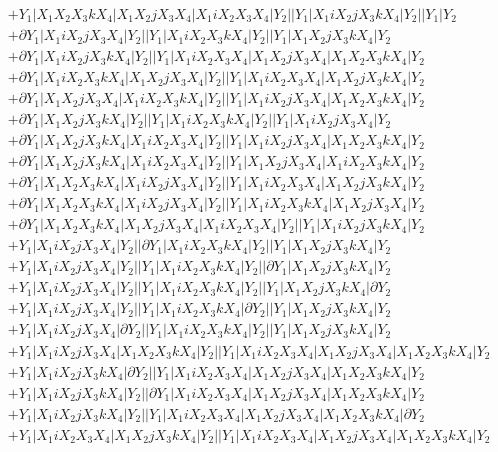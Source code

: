\documentclass{article}[12pt]
\begin{document}
\begin{align*}
 & + Y_1|X_1X_2X_3kX_4|X_1X_2jX_3X_4|X_1iX_2X_3X_4|Y_2||Y_1|X_1iX_2jX_3kX_4|Y_2||Y_1|Y_2\\ 
& +\partial Y_1|X_1iX_2jX_3X_4|Y_2||Y_1|X_1iX_2X_3kX_4|Y_2||Y_1|X_1X_2jX_3kX_4|Y_2\\ 
 & +\partial Y_1|X_1iX_2jX_3kX_4|Y_2||Y_1|X_1iX_2X_3X_4|X_1X_2jX_3X_4|X_1X_2X_3kX_4|Y_2\\ 
 & +\partial Y_1|X_1iX_2X_3kX_4|X_1X_2jX_3X_4|Y_2||Y_1|X_1iX_2X_3X_4|X_1X_2jX_3kX_4|Y_2\\ 
 & +\partial Y_1|X_1X_2jX_3X_4|X_1iX_2X_3kX_4|Y_2||Y_1|X_1iX_2jX_3X_4|X_1X_2X_3kX_4|Y_2\\ 
 & +\partial Y_1|X_1X_2jX_3kX_4|Y_2||Y_1|X_1iX_2X_3kX_4|Y_2||Y_1|X_1iX_2jX_3X_4|Y_2\\ 
 & +\partial Y_1|X_1X_2jX_3kX_4|X_1iX_2X_3X_4|Y_2||Y_1|X_1iX_2jX_3X_4|X_1X_2X_3kX_4|Y_2\\ 
 & +\partial Y_1|X_1X_2jX_3kX_4|X_1iX_2X_3X_4|Y_2||Y_1|X_1X_2jX_3X_4|X_1iX_2X_3kX_4|Y_2\\ 
 & +\partial Y_1|X_1X_2X_3kX_4|X_1iX_2jX_3X_4|Y_2||Y_1|X_1iX_2X_3X_4|X_1X_2jX_3kX_4|Y_2\\ 
 & +\partial Y_1|X_1X_2X_3kX_4|X_1iX_2jX_3X_4|Y_2||Y_1|X_1iX_2X_3kX_4|X_1X_2jX_3X_4|Y_2\\ 
 & +\partial Y_1|X_1X_2X_3kX_4|X_1X_2jX_3X_4|X_1iX_2X_3X_4|Y_2||Y_1|X_1iX_2jX_3kX_4|Y_2\\ 
 & +Y_1|X_1iX_2jX_3X_4|Y_2||\partial Y_1|X_1iX_2X_3kX_4|Y_2||Y_1|X_1X_2jX_3kX_4|Y_2\\ 
 & +Y_1|X_1iX_2jX_3X_4|Y_2||Y_1|X_1iX_2X_3kX_4|Y_2||\partial Y_1|X_1X_2jX_3kX_4|Y_2\\ 
 & +Y_1|X_1iX_2jX_3X_4|Y_2||Y_1|X_1iX_2X_3kX_4|Y_2||Y_1|X_1X_2jX_3kX_4|\partial Y_2\\ 
 & +Y_1|X_1iX_2jX_3X_4|Y_2||Y_1|X_1iX_2X_3kX_4|\partial Y_2||Y_1|X_1X_2jX_3kX_4|Y_2\\ 
 & +Y_1|X_1iX_2jX_3X_4|\partial Y_2||Y_1|X_1iX_2X_3kX_4|Y_2||Y_1|X_1X_2jX_3kX_4|Y_2\\ 
 & +Y_1|X_1iX_2jX_3X_4|X_1X_2X_3kX_4|Y_2||Y_1|X_1iX_2X_3X_4|X_1X_2jX_3X_4|X_1X_2X_3kX_4|Y_2\\ 
 & +Y_1|X_1iX_2jX_3kX_4|\partial Y_2||Y_1|X_1iX_2X_3X_4|X_1X_2jX_3X_4|X_1X_2X_3kX_4|Y_2\\ 
 & +Y_1|X_1iX_2jX_3kX_4|Y_2||\partial Y_1|X_1iX_2X_3X_4|X_1X_2jX_3X_4|X_1X_2X_3kX_4|Y_2\\ 
 & +Y_1|X_1iX_2jX_3kX_4|Y_2||Y_1|X_1iX_2X_3X_4|X_1X_2jX_3X_4|X_1X_2X_3kX_4|\partial Y_2\\ 
 & +Y_1|X_1iX_2X_3X_4|X_1X_2jX_3kX_4|Y_2||Y_1|X_1iX_2X_3X_4|X_1X_2jX_3X_4|X_1X_2X_3kX_4|Y_2\\ 
   \end{align*}
\end{document}
